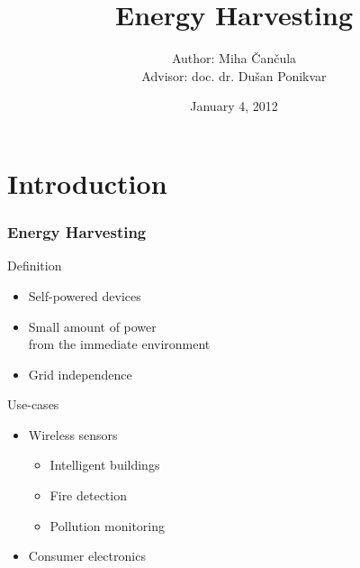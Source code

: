 \documentclass{beamer}
\title{Energy Harvesting}
\author{Author: Miha \v Can\v cula \\
  Advisor: doc. dr. Du\v san Ponikvar}
\institute{Faculty of Mathematics and Physics \\ University of Ljubljana}
\date{January 4, 2012}
\begin{document}
\frame{\titlepage}

\section{Introduction}

\begin{frame}
  \frametitle{Energy Harvesting}

\begin{block}{Definition}
  \begin{itemize}
    \item Self-powered devices
    \item Small amount of power \\ from the immediate environment
    \item Grid independence
  \end{itemize}
\end{block}

\begin{block}{Use-cases}
  \begin{itemize}
    \item Wireless sensors
    \begin{itemize}
      \item{Intelligent buildings}
      \item{Fire detection}
      \item{Pollution monitoring}
    \end{itemize}
    \item Consumer electronics
  \end{itemize}
\end{block}

\end{frame}
\end{document}

